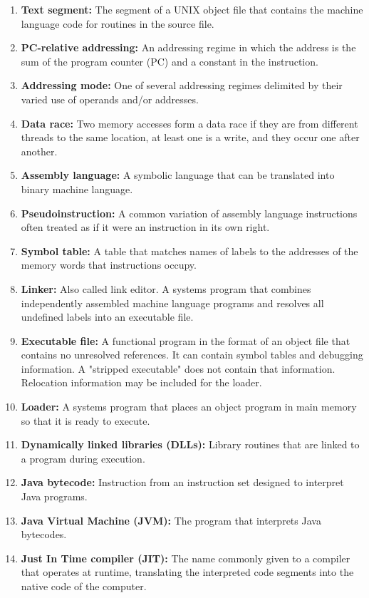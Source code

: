 \documentclass{article}
\begin{document}
\begin{enumerate}
    \item \textbf{Text segment:} The segment of a UNIX object file that contains the machine language code for routines in the source file.
    \item \textbf{PC-relative addressing:} An addressing regime in which the address is the sum of the program counter (PC) and a constant in the instruction.
    \item \textbf{Addressing mode:} One of several addressing regimes delimited by their varied use of operands and/or addresses.
    \item \textbf{Data race:} Two memory accesses form a data race if they are from different threads to the same location, at least one is a write, and they occur one after another.
    \item \textbf{Assembly language:} A symbolic language that can be translated into binary machine language.
    \item \textbf{Pseudoinstruction:} A common variation of assembly language instructions often treated as if it were an instruction in its own right.
    \item \textbf{Symbol table:} A table that matches names of labels to the addresses of the memory words that instructions occupy.
    \item \textbf{Linker:} Also called link editor. A systems program that combines independently assembled machine language programs and resolves all undefined labels into an executable file.
    \item \textbf{Executable file:} A functional program in the format of an object file that contains no unresolved references. It can contain symbol tables and debugging information. A "stripped executable" does not contain that information. Relocation information may be included for the loader.
    \item \textbf{Loader:} A systems program that places an object program in main memory so that it is ready to execute.
    \item \textbf{Dynamically linked libraries (DLLs):} Library routines that are linked to a program during execution.
    \item \textbf{Java bytecode:} Instruction from an instruction set designed to interpret Java programs.
    \item \textbf{Java Virtual Machine (JVM):} The program that interprets Java bytecodes.
    \item \textbf{Just In Time compiler (JIT):} The name commonly given to a compiler that operates at runtime, translating the interpreted code segments into the native code of the computer.
\end{enumerate}
\end{document}
